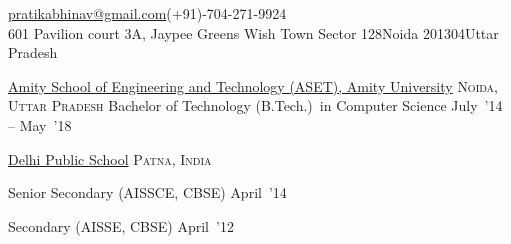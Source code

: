 \documentclass[10pt,a4paper]{article}
\begin{document}
\sloppy  %



\nobreakvspace{0.3em}  %

\noindent\href{mailto:pratikabhinav@gmail.com}{pratikabhinav\mbox{}@\mbox{}gmail.com}\sbull (+91)-704-271-9924\\
601 Pavilion court 3A, Jaypee Greens Wish Town\sbull
Sector 128\sbull Noida 201304\sbull Uttar Pradesh
\spacedhrule{0.5em}{-0.4em}


\headedsection
  {\href{}{Amity School of Engineering and Technology (ASET), Amity University}}
  {\textsc{Noida, Uttar Pradesh}} {%
  \headedsubsection
    {Bachelor of Technology (B.Tech.)~in Computer Science}
    {July~'14 -- May~'18} {}
}



\headedsection
{\href{}{Delhi Public School}}
{\textsc{Patna, India}} {%
	\headedsubsection
	{Senior Secondary (AISSCE, CBSE)}
	{April~'14} {}

	\headedsubsection
	{Secondary (AISSE, CBSE)}
	{April~'12} {}
	
}

\spacedhrule{0.5em}{-0.4em}
\end{document}

